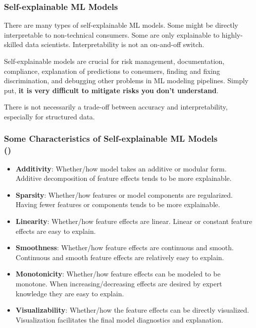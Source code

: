 \documentclass[11pt,aspectratio=169,hyperref={colorlinks}]{beamer}
\begin{document}
		\begin{frame}
	
			\frametitle{Self-explainable ML Models}			
	
			\small
			
			There are many types of self-explainable ML models. Some might be directly interpretable to non-technical consumers. Some are only explainable to highly-skilled data scientists. Interpretability is not an on-and-off switch.
			
			\vspace{10pt}
			
			Self-explainable models are crucial for risk management, documentation, compliance, explanation of predictions to consumers, finding and fixing discrimination, and  debugging other problems in ML modeling pipelines. Simply put, \textbf{it is very difficult to mitigate risks you don't understand}.
			
			\vspace{10pt}
			
			There is not necessarily a trade-off between accuracy and interpretability, especially for structured data.
			
			\normalsize
			
		\end{frame}	

		\begin{frame}
	
			\frametitle{Some Characteristics of Self-explainable ML Models\\ (\small{\cite{sudjianto2021designing})}}			
			
			\small
			
			\begin{itemize}
				\item \textbf{Additivity}: Whether/how model takes an additive or modular form. Additive decomposition of feature effects tends to be more explainable.
				\item \textbf{Sparsity}: Whether/how features or model components are regularized. Having fewer features or components tends to be more explainable.
				\item \textbf{Linearity}: Whether/how feature effects are linear. Linear or constant feature effects are easy to explain.
				\item \textbf{Smoothness}: Whether/how feature effects are continuous and smooth. Continuous and smooth feature effects are relatively easy to explain.
				\item \textbf{Monotonicity}: Whether/how feature effects can be modeled to be monotone. When increasing/decreasing effects are desired by expert knowledge they are easy to explain.
				\item \textbf{Visualizability}: Whether/how the feature effects can be directly visualized. Visualization facilitates the final model diagnostics and explanation.
			\end{itemize}
			
			\normalsize
			
		\end{frame}	
\end{document}
